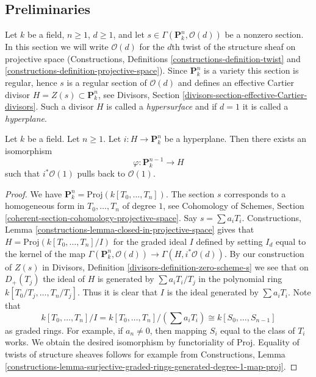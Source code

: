 \subsection{Preliminaries}
\label{subsection-preliminaries}

\noindent
Let $k$ be a field, $n \geq 1$, $d \geq 1$, and let
$s \in \Gamma(\mathbf{P}_k^n, \mathcal{O}(d))$
be a nonzero section. In this section we will write $\mathcal{O}(d)$
for the $d$th twist of the structure sheaf on projective space
(Constructions, Definitions \ref{constructions-definition-twist} and
\ref{constructions-definition-projective-space}).
Since $\mathbf{P}^n_k$ is a variety this section is regular, hence
$s$ is a regular section of $\mathcal{O}(d)$ and defines an effective
Cartier divisor $H = Z(s) \subset \mathbf{P}^n_k$, see
Divisors, Section \ref{divisors-section-effective-Cartier-divisors}.
Such a divisor $H$ is called a {\it hypersurface} and if $d = 1$
it is called a {\it hyperplane}.

\begin{lemma}
\label{lemma-hyperplane}
Let $k$ be a field. Let $n \geq 1$.
Let $i : H \to \mathbf{P}^n_k$ be a hyperplane.
Then there exists an isomorphism
$$
\varphi : \mathbf{P}^{n - 1}_k \longrightarrow H
$$
such that $i^*\mathcal{O}(1)$ pulls back to $\mathcal{O}(1)$.
\end{lemma}

\begin{proof}
We have $\mathbf{P}^n_k = \text{Proj}(k[T_0, \ldots, T_n])$.
The section $s$ corresponds to a homogeneous form in $T_0, \ldots, T_n$
of degree $1$, see
Cohomology of Schemes, Section
\ref{coherent-section-cohomology-projective-space}.
Say $s = \sum a_i T_i$.
Constructions, Lemma \ref{constructions-lemma-closed-in-projective-space}
gives that
$H = \text{Proj}(k[T_0, \ldots, T_n]/I)$ for the graded ideal $I$
defined by setting $I_d$ equal to the kernel of the map
$\Gamma(\mathbf{P}^n_k, \mathcal{O}(d)) \to \Gamma(H, i^*\mathcal{O}(d))$.
By our construction of $Z(s)$ in Divisors, 
Definition \ref{divisors-definition-zero-scheme-s}
we see that on $D_{+}(T_j)$ the ideal of $H$ is generated by
$\sum a_i T_i/T_j$ in the polynomial ring
$k[T_0/T_j, \ldots, T_n/T_j]$. Thus it is clear that $I$ is the ideal
generated by $\sum a_i T_i$. Note that
$$
k[T_0, \ldots, T_n]/I = k[T_0, \ldots, T_n]/(\sum a_i T_i) \cong
k[S_0, \ldots, S_{n - 1}]
$$
as graded rings. For example, if $a_n \not = 0$, then mapping
$S_i$ equal to the class of $T_i$ works. We obtain the desired isomorphism
by functoriality of $\text{Proj}$.
Equality of twists of structure sheaves follows for example from
Constructions, Lemma
\ref{constructions-lemma-surjective-graded-rings-generated-degree-1-map-proj}.
\end{proof}

